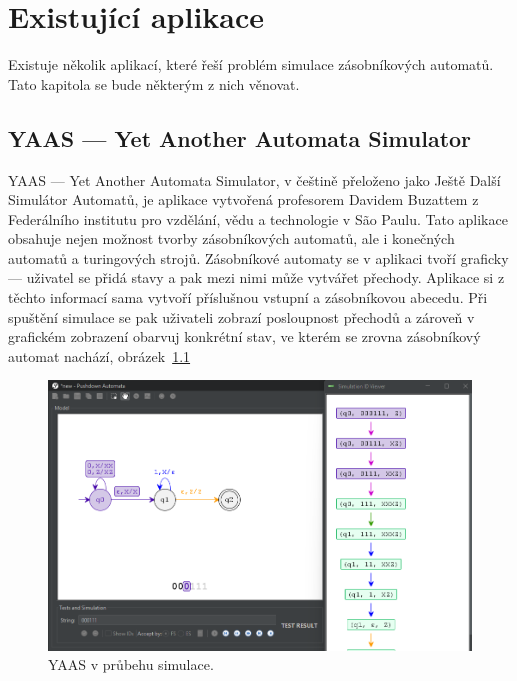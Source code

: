 \chapter{Existující aplikace}\label{chap:ExistingApps}

Existuje několik aplikací, které řeší problém simulace zásobníkových automatů. Tato kapitola se bude některým z nich věnovat.

\section{YAAS --- Yet Another Automata Simulator}

YAAS --- Yet Another Automata Simulator, v češtině přeloženo jako Ještě Další Simulátor Automatů, je aplikace vytvořená profesorem Davidem Buzattem z Federálního institutu pro vzdělání, vědu a technologie v São Paulu. Tato aplikace obsahuje nejen možnost tvorby zásobníkových automatů, ale i konečných automatů a turingových strojů. Zásobníkové automaty se v aplikaci tvoří graficky --- uživatel se přidá stavy a pak mezi nimi může vytvářet přechody. Aplikace si z těchto informací sama vytvoří příslušnou vstupní a zásobníkovou abecedu. Při spuštění simulace se pak uživateli zobrazí posloupnost přechodů a zároveň v grafickém zobrazení obarvuj konkrétní stav, ve kterém se zrovna zásobníkový automat nachází, obrázek~\ref{fig:YAAS}

\begin{figure}[h]
    \centering
    \includegraphics[width=\textwidth]{Figures/PrntScrn_YAAS.png}
    \caption{YAAS v průbehu simulace.}\label{fig:YAAS}
\end{figure}

